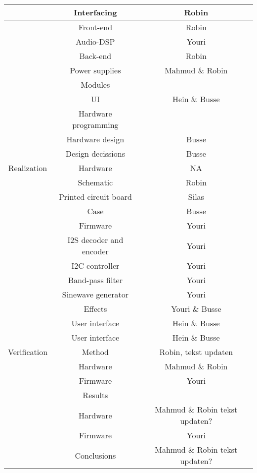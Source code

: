 \begin{justify}
\begin{table}[!h]
\begin{tabular}{|c|c|c|}
							& Interfacing					& Robin				\\ \hline
							& Front-end						& Robin				\\ \hline
							& Audio-DSP						& Youri				\\ \hline
							& Back-end						& Robin				\\ \hline
							& Power supplies				& Mahmud \& Robin	\\ \hline
							& Modules						& 					\\ \hline
							& UI							& Hein \& Busse		\\ \hline
							& Hardware programming			& 					\\ \hline
							& Hardware design				& Busse					\\ \hline
							& Design decissions				& Busse					\\ \hline
Realization					& Hardware						& NA				\\ \hline
							& Schematic						& Robin				\\ \hline
							& Printed circuit board			& Silas				\\ \hline
							& Case							& Busse				\\ \hline
							& Firmware						& Youri				\\ \hline
							& I2S decoder and encoder		& Youri				\\ \hline
							& I2C controller				& Youri				\\ \hline
							& Band-pass filter				& Youri				\\ \hline
							& Sinewave generator			& Youri				\\ \hline
							& Effects						& Youri \& Busse	\\ \hline
							& User interface				& Hein \& Busse		\\ \hline
							& User interface				& Hein \& Busse		\\ \hline
Verification				& Method						& Robin, tekst updaten					\\ \hline
							& Hardware						& Mahmud \& Robin	\\ \hline
							& Firmware						& Youri				\\ \hline
							& Results						& 					\\ \hline
							& Hardware						& Mahmud \& Robin tekst updaten?					\\ \hline
							& Firmware						& Youri					\\ \hline
							& Conclusions					& Mahmud \& Robin tekst updaten?					\\ \hline

\end{tabular}
\end{table}
\end{justify}
